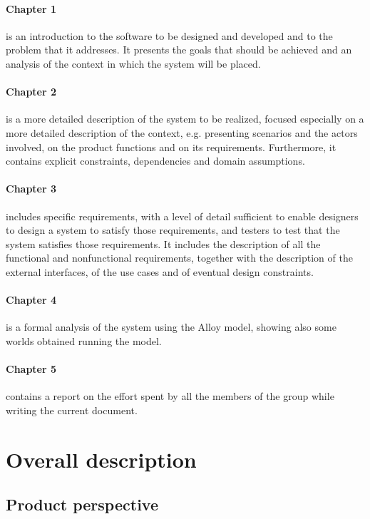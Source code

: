 \documentclass[a4paper,oneside,11pt]{book}   %
\begin{document}
    \subsubsection{Chapter 1} is an introduction to the software to be designed and developed and to the problem that it addresses. It presents the goals that should be achieved and an analysis of the context in which the system will be placed.
    \subsubsection{Chapter 2} is a more detailed description of the system to be realized, focused especially on a more detailed description of the context, e.g. presenting scenarios and the actors involved, on the product functions and on its requirements. Furthermore, it contains explicit constraints, dependencies and domain assumptions.
    \subsubsection{Chapter 3} includes specific requirements, with a level of detail sufficient to enable designers to design a system to satisfy those requirements, and testers to test that the system satisfies those requirements. It includes the description of all the functional and nonfunctional requirements, together with the description of the external interfaces, of the use cases and of eventual design constraints.
    \subsubsection{Chapter 4} is a formal analysis of the system using the Alloy model, showing also some worlds obtained running the model.
    \subsubsection{Chapter 5} contains a report on the effort spent by all the members of the group while writing the current document.

\chapter{Overall description}
    \section{Product perspective}
\end{document}
